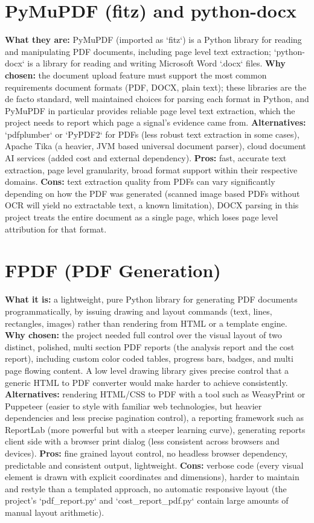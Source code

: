 \documentclass[11pt,a4paper]{report}
\begin{document}
\section{PyMuPDF (fitz) and python-docx}
\textbf{What they are:} PyMuPDF (imported as `fitz`) is a Python library for reading and manipulating PDF documents, including page level text extraction; `python-docx` is a library for reading and writing Microsoft Word `.docx` files.
\textbf{Why chosen:} the document upload feature must support the most common requirements document formats (PDF, DOCX, plain text); these libraries are the de facto standard, well maintained choices for parsing each format in Python, and PyMuPDF in particular provides reliable page level text extraction, which the project needs to report which page a signal's evidence came from.
\textbf{Alternatives:} `pdfplumber` or `PyPDF2` for PDFs (less robust text extraction in some cases), Apache Tika (a heavier, JVM based universal document parser), cloud document AI services (added cost and external dependency).
\textbf{Pros:} fast, accurate text extraction, page level granularity, broad format support within their respective domains.
\textbf{Cons:} text extraction quality from PDFs can vary significantly depending on how the PDF was generated (scanned image based PDFs without OCR will yield no extractable text, a known limitation), DOCX parsing in this project treats the entire document as a single page, which loses page level attribution for that format.

\section{FPDF (PDF Generation)}
\textbf{What it is:} a lightweight, pure Python library for generating PDF documents programmatically, by issuing drawing and layout commands (text, lines, rectangles, images) rather than rendering from HTML or a template engine.
\textbf{Why chosen:} the project needed full control over the visual layout of two distinct, polished, multi section PDF reports (the analysis report and the cost report), including custom color coded tables, progress bars, badges, and multi page flowing content. A low level drawing library gives precise control that a generic HTML to PDF converter would make harder to achieve consistently.
\textbf{Alternatives:} rendering HTML/CSS to PDF with a tool such as WeasyPrint or Puppeteer (easier to style with familiar web technologies, but heavier dependencies and less precise pagination control), a reporting framework such as ReportLab (more powerful but with a steeper learning curve), generating reports client side with a browser print dialog (less consistent across browsers and devices).
\textbf{Pros:} fine grained layout control, no headless browser dependency, predictable and consistent output, lightweight.
\textbf{Cons:} verbose code (every visual element is drawn with explicit coordinates and dimensions), harder to maintain and restyle than a templated approach, no automatic responsive layout (the project's `pdf_report.py` and `cost_report_pdf.py` contain large amounts of manual layout arithmetic).
\end{document}
